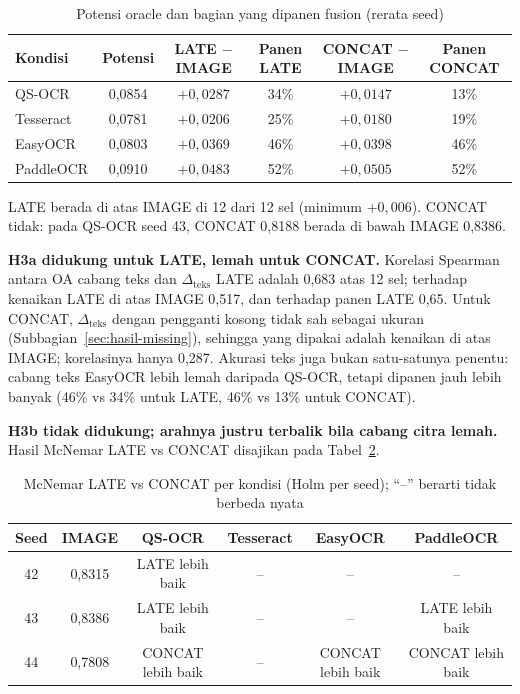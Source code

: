 \begin{table}[H]
  \centering
  \caption{Potensi oracle dan bagian yang dipanen fusion (rerata seed)}
  \label{tab:panen}
  \fontsize{10}{12}\selectfont
  \begin{tabular}{|l|c|c|c|c|c|}
    \hline
    \textbf{Kondisi} & \textbf{Potensi} & \textbf{LATE $-$ IMAGE} & \textbf{Panen LATE} &
    \textbf{CONCAT $-$ IMAGE} & \textbf{Panen CONCAT} \\ \hline
    QS-OCR & 0,0854 & $+0{,}0287$ & 34\% & $+0{,}0147$ & 13\% \\ \hline
    Tesseract & 0,0781 & $+0{,}0206$ & 25\% & $+0{,}0180$ & 19\% \\ \hline
    EasyOCR & 0,0803 & $+0{,}0369$ & 46\% & $+0{,}0398$ & 46\% \\ \hline
    PaddleOCR & 0,0910 & $+0{,}0483$ & 52\% & $+0{,}0505$ & 52\% \\ \hline
  \end{tabular}
\end{table}

LATE berada di atas IMAGE di 12 dari 12 sel (minimum $+0{,}006$). CONCAT tidak: pada
QS-OCR seed 43, CONCAT 0,8188 berada di bawah IMAGE 0,8386.

\textbf{H3a didukung untuk LATE, lemah untuk CONCAT.} Korelasi Spearman antara OA cabang
teks dan $\Delta_\text{teks}$ LATE adalah 0,683 atas 12 sel; terhadap kenaikan LATE di
atas IMAGE 0,517, dan terhadap panen LATE 0,65. Untuk CONCAT, $\Delta_\text{teks}$ dengan
pengganti kosong tidak sah sebagai ukuran (Subbagian~\ref{sec:hasil-missing}), sehingga
yang dipakai adalah kenaikan di atas IMAGE; korelasinya hanya 0,287. Akurasi teks juga
bukan satu-satunya penentu: cabang teks EasyOCR lebih lemah daripada QS-OCR, tetapi
dipanen jauh lebih banyak (46\% vs 34\% untuk LATE, 46\% vs 13\% untuk CONCAT).

\textbf{H3b tidak didukung; arahnya justru terbalik bila cabang citra lemah.} Hasil
McNemar LATE vs CONCAT disajikan pada Tabel~\ref{tab:late-concat}.

\begin{table}[H]
  \centering
  \caption{McNemar LATE vs CONCAT per kondisi (Holm per seed); \enquote{--} berarti tidak
  berbeda nyata}
  \label{tab:late-concat}
  \fontsize{10}{12}\selectfont
  \begin{tabular}{|c|c|c|c|c|c|}
    \hline
    \textbf{Seed} & \textbf{IMAGE} & \textbf{QS-OCR} & \textbf{Tesseract} & \textbf{EasyOCR} &
    \textbf{PaddleOCR} \\ \hline
    42 & 0,8315 & LATE lebih baik & -- & -- & -- \\ \hline
    43 & 0,8386 & LATE lebih baik & -- & -- & LATE lebih baik \\ \hline
    44 & 0,7808 & CONCAT lebih baik & -- & CONCAT lebih baik & CONCAT lebih baik \\ \hline
  \end{tabular}
\end{table}

